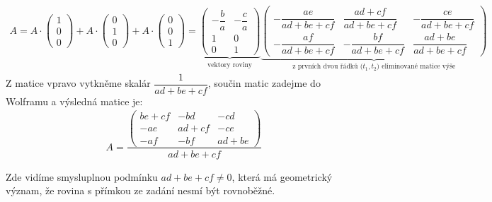 \documentclass[12pt]{article}
\begin{document}
    \begin{align*}
        A = A \cdot \left(\begin{array}{c} 1 \\ 0 \\ 0 \end{array}\right)+
          A \cdot \left(\begin{array}{c} 0 \\ 1 \\ 0 \end{array}\right)+
          A \cdot \left(\begin{array}{c} 0 \\ 0 \\ 1 \end{array}\right)
          =
        \underbrace{\begin{pmatrix}
        -\dfrac{b}{a} & -\dfrac{c}{a} \\
        1 & 0 \\
        0 & 1
        \end{pmatrix}}
        _{\text{vektory roviny}}
        \underbrace{\begin{pmatrix}
        -\dfrac{a e}{a d + b e + c f} &
        \dfrac{a d + c f}{a d + b e + c f} &
        -\dfrac{c e}{a d + b e + c f} \\
        -\dfrac{a f}{a d + b e + c f} &
        -\dfrac{b f}{a d + b e + c f} &
        \dfrac{a d + b e}{a d + b e + c f}
        \end{pmatrix}}
        _{\text{z prvních dvou řádků (}t_1,t_2\text{) eliminované matice výše}}
    \end{align*}
    Z matice vpravo vytkněme skalár $\dfrac{1}{ad+be+cf}$, součin matic zadejme do Wolframu a výsledná matice je:
    \begin{align*}
        A = 
        \dfrac{\begin{pmatrix}
        b e + c f & -b d & -c d \\
        -a e & a d + c f & - c e \\
        -a f & - b f & a d + b e
          \end{pmatrix}}{
            ad+be+cf
          }
    \end{align*}

    Zde vidíme smysluplnou podmínku $ad+be+cf \neq 0$,
    která má geometrický význam, že rovina s přímkou ze zadání nesmí být rovnoběžné.
\end{document}
